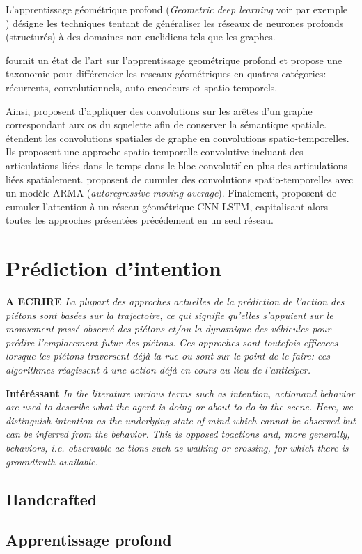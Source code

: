 L'apprentissage géométrique profond (\textit{Geometric deep learning} voir par exemple \\ \cite{gori2005new,scarselli2008graph,bronstein2017geometric}) désigne les techniques tentant de généraliser les réseaux de neurones profonds (structurés) à des domaines non euclidiens tels que les graphes. 

\cite{wu2019comprehensive} fournit un état de l'art sur l'apprentissage geométrique profond et propose une taxonomie pour différencier les reseaux géométriques en quatres catégories: récurrents, convolutionnels, auto-encodeurs et spatio-temporels.

Ainsi, \cite{2018arXiv180506184Z} proposent d'appliquer des convolutions sur les arêtes d'un graphe correspondant aux os du squelette afin de conserver la sémantique spatiale.
\cite{yan2018spatial} étendent les convolutions spatiales de graphe en convolutions spatio-temporelles. Ils proposent une approche spatio-temporelle convolutive incluant des articulations liées dans le temps dans le bloc convolutif en plus des articulations liées spatialement. \cite{2018arXiv180209834L} proposent de cumuler des convolutions spatio-temporelles avec un modèle ARMA (\textit{autoregressive moving average}). Finalement,  \cite{Si_2019_CVPR} proposent de cumuler l'attention à un réseau géométrique CNN-LSTM, capitalisant alors toutes les approches présentées précédement en un seul réseau.

\section{Prédiction d'intention}

\textbf{A ECRIRE}
\textit{La plupart des approches actuelles de la prédiction de l'action des piétons sont basées sur la trajectoire, ce qui signifie qu'elles s'appuient sur le mouvement passé observé des piétons et/ou la dynamique des véhicules pour prédire l'emplacement futur des piétons. Ces approches sont toutefois efficaces lorsque les piétons traversent déjà la rue ou sont sur le point de le faire: ces algorithmes réagissent à une action déjà en cours au lieu de l'anticiper.}


\textbf{Intéréssant}
\textit{In the literature various terms such as intention, actionand behavior are used to describe what the agent is doing or about to do in the scene. Here, we distinguish intention as the underlying state of mind which cannot be observed but can be inferred from the behavior. This is opposed toactions and, more generally, behaviors, i.e. observable ac-tions such as walking or crossing, for which there is groundtruth available.}




\subsection{Handcrafted}
\subsection{Apprentissage profond}


